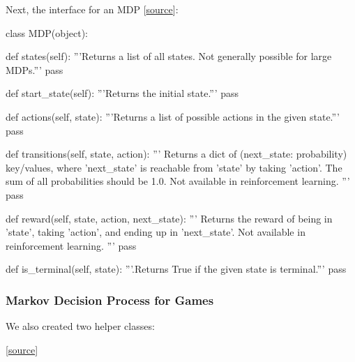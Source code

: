 \documentclass{article}
\newcommand{\GithubURL}[1]{[\href{https://github.com/davidrobles/mlnd-capstone-code/blob/master/#1}{source}]}
\begin{document}
Next, the interface for an MDP \GithubURL{capstone/rl/mdp.py}:

\begin{python}
class MDP(object):

    def states(self):
        '''Returns a list of all states. Not generally possible for large MDPs.'''
        pass

    def start_state(self):
        '''Returns the initial state.'''
        pass

    def actions(self, state):
        '''Returns a list of possible actions in the given state.'''
        pass

    def transitions(self, state, action):
        '''
        Returns a dict of (next_state: probability) key/values, where 'next_state' is
        reachable from 'state' by taking 'action'. The sum of all probabilities should
        be 1.0. Not available in reinforcement learning.
        '''
        pass

    def reward(self, state, action, next_state):
        '''
        Returns the reward of being in 'state', taking 'action', and ending up
        in 'next_state'. Not available in reinforcement learning.
        '''
        pass

    def is_terminal(self, state):
        '''.Returns True if the given state is terminal.'''
        pass
\end{python}

\subsubsection{Markov Decision Process for Games}

We also created two helper classes:

\GithubURL{capstone/rl/mdp.py}
\end{document}
